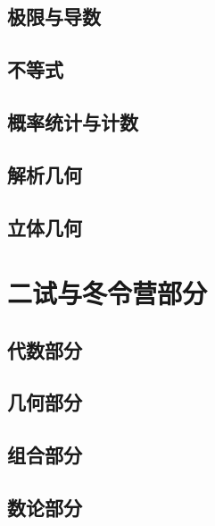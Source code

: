 \documentclass[lang=cn, zihao=4.5]{elegantbook}
\begin{document}
\chapter{极限与导数}

\chapter{不等式}

\chapter{概率统计与计数}

\chapter{解析几何}

\chapter{立体几何}








\part{二试与冬令营部分}

\chapter{代数部分}

\chapter{几何部分}

\chapter{组合部分}

\chapter{数论部分}
\end{document}
